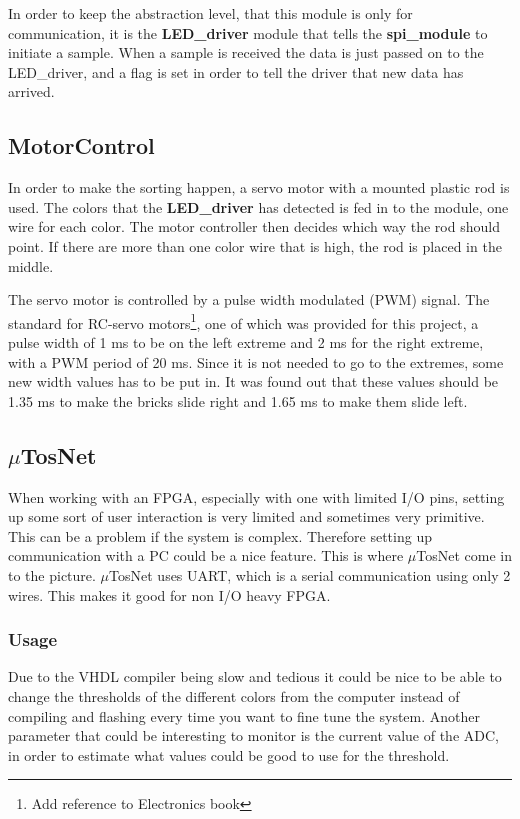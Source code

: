 In order to keep the abstraction level, that this module is only for communication, it is the \textbf{LED\_driver} module that tells the \textbf{spi\_module} to initiate a sample. When a sample is received the data is just passed on to the LED\_driver, and a flag is set in order to tell the driver that new data has arrived.

\subsection{MotorControl}
In order to make the sorting happen, a servo motor with a mounted plastic rod is used. The colors that the \textbf{LED\_driver} has detected is fed in to the module, one wire for each color. The motor controller then decides which way the rod should point. If there are more than one color wire that is high, the rod is placed in the middle. 

The servo motor is controlled by a pulse width modulated (PWM) signal. The standard for RC-servo motors\footnote{Add reference to Electronics book}, one of which was provided for this project, a pulse width of 1 ms to be on the left extreme and 2 ms for the right extreme, with a PWM period of 20 ms. Since it is not needed to go to the extremes, some new width values has to be put in. It was found out that these values should be 1.35 ms to make the bricks slide right and 1.65 ms to make them slide left.

\subsection{$\mu$TosNet}
When working with an FPGA, especially with one with limited I/O pins, setting up some sort of user interaction is very limited and sometimes very primitive. This can be a problem if the system is complex. Therefore setting up communication with a PC could be a nice feature. This is where $\mu$TosNet come in to the picture. $\mu$TosNet uses UART, which is a serial communication using only 2 wires. This makes it good for non I/O heavy FPGA. 

\subsubsection{Usage}
Due to the VHDL compiler being slow and tedious it could be nice to be able to change the thresholds of the different colors from the computer instead of compiling and flashing every time you want to fine tune the system. Another parameter that could be interesting to monitor is the current value of the ADC, in order to estimate what values could be good to use for the threshold. 
